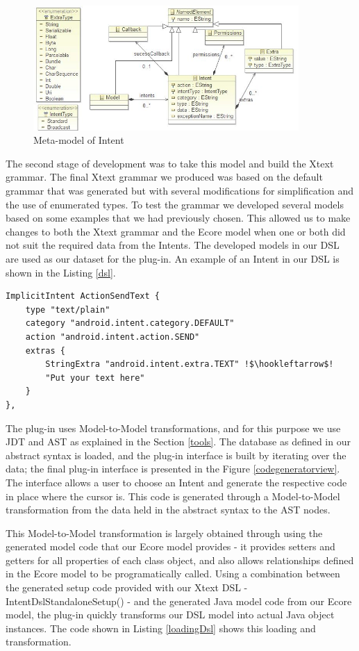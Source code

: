 \begin{figure}[t]
\label{meta-model}
  \centering
    \includegraphics[width=0.9\textwidth]{metamodel}
  \caption{Meta-model of Intent}
\end{figure}

The second stage of development was to take this model and build the Xtext grammar. The final Xtext grammar we produced was based on the default grammar that was generated but with several modifications for simplification and the use of enumerated types. To test the grammar we developed several models based on some examples that we had previously chosen. This allowed us to make changes to both the Xtext grammar and the Ecore model when one or both did not suit the required data from the Intents. The developed models in our DSL are used as our dataset for the plug-in. An example of an Intent in our DSL is shown in the Listing \ref{dsl}.

{\footnotesize\begin{lstlisting}[escapechar=!,label=dsl,caption=Intent in DSL]
ImplicitIntent ActionSendText {
	type "text/plain"
	category "android.intent.category.DEFAULT"
	action "android.intent.action.SEND"
	extras {
		StringExtra "android.intent.extra.TEXT" !$\hookleftarrow$!
		"Put your text here"
	}
},
\end{lstlisting}}

The plug-in uses Model-to-Model transformations, and for this purpose we use JDT and AST as explained in the Section \ref{tools}. The database as defined in our abstract syntax is loaded, and the plug-in interface is built by iterating over the data; the final plug-in interface is presented in the Figure \ref{codegeneratorview}. The interface allows a user to choose an Intent and generate the respective code in place where the cursor is. This code is generated through a Model-to-Model transformation from the data held in the abstract syntax to the AST nodes.

This Model-to-Model transformation is largely obtained through using the generated model code that our Ecore model provides - it provides setters and getters for all properties of each class object, and also allows relationships defined in the Ecore model to be programatically called. Using a combination between the generated setup code provided with our Xtext DSL - IntentDslStandaloneSetup() - and the generated Java model code from our Ecore model, the plug-in quickly transforms our DSL model into actual Java object instances. The code shown in Listing \ref{loadingDsl} shows this loading and transformation.

